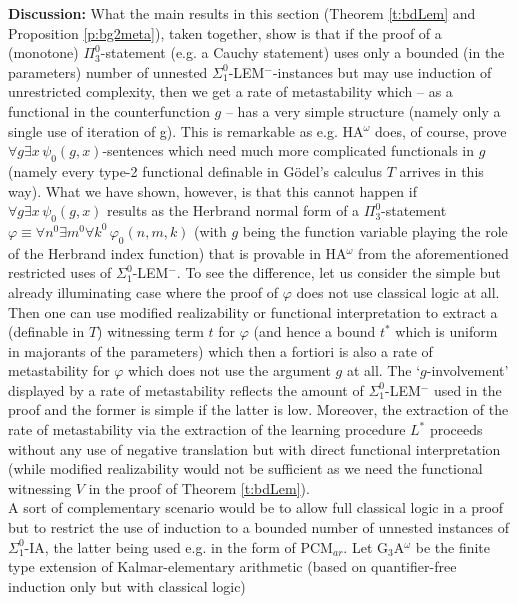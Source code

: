 \documentclass[1p]{elsarticle}
\theoremstyle{plain}
\theoremstyle{definition}
\theoremstyle{remark}
\theoremstyle{definition}
\begin{document}
{{\bf Discussion:} What the main results in this section (Theorem 
\ref{t:bdLem} and Proposition \ref{p:bg2meta}), taken together, show 
is that if the proof of a (monotone) $\Pi^0_3$-statement (e.g. a 
Cauchy statement) uses only a bounded (in the 
parameters) number of unnested 
$\Sigma^0_1$-LEM$^-$-instances but may use induction 
of unrestricted complexity, then we get a rate of metastability which 
-- as a functional in the counterfunction $g$ -- has a very simple structure 
(namely only a single use of iteration of g). This is remarkable as e.g. 
HA$^{\omega}$ does, of course, 
prove $\forall g \exists x\,\psi_0(g,x)$-sentences 
which need 
much more complicated functionals in $g$ (namely every type-2 functional
definable in G\"odel's calculus $T$ arrives in this way). What we have shown, 
however, is that this cannot happen if $\forall g \exists x\,\psi_0(g,x)$
results as the Herbrand normal form of a $\Pi^0_3$-statement 
$\varphi\equiv \forall n^0\exists m^0\forall k^0\,\varphi_0(n,m,k)$ 
(with $g$ being the function variable playing the role of the Herbrand 
index function) that is provable 
in HA$^{\omega}$ from the aforementioned restricted uses of 
$\Sigma^0_1$-LEM$^-.$ To see the difference, 
let us consider the simple but already illuminating 
case where the proof of $\varphi$ does not use classical logic 
at all. Then one can use modified realizability or functional interpretation 
to extract a (definable in $T$) witnessing term $t$ for $\varphi$ 
(and hence a bound $t^*$ which is uniform in majorants of the parameters) 
which then a fortiori is also a rate of metastability for $\varphi$ 
which does not use the argument $g$ at all.
The `$g$-involvement' displayed by a rate of metastability reflects the 
amount of $\Sigma^0_1$-LEM$^-$ used in the proof and the former 
is simple if the latter is low. Moreover, the extraction of the rate of 
metastability via the extraction of the learning procedure $L^*$ proceeds 
without any use of negative translation but with direct functional 
interpretation (while modified realizability would not be sufficient as 
we need the functional witnessing $V$ in the proof of Theorem 
\ref{t:bdLem}).
\\[2mm] 
A sort of complementary scenario would be to allow full classical logic 
in a proof but to restrict the use of induction to a bounded number of 
unnested instances of $\Sigma^0_1$-IA, the latter being used e.g. in 
the form of PCM$_{ar}.$ Let {\rm G$_3$A$^{\omega}$} be 
the finite type extension of Kalmar-elementary 
arithmetic (based on quantifier-free induction only but with classical logic) 
}
\end{document}
